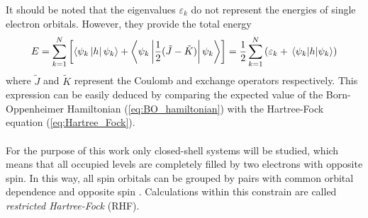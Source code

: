 It should be noted that the eigenvalues $\varepsilon_k$ %
do not represent the energies of single electron orbitals. However, they provide the total energy
\begin{equation}
    E = \sum_{k=1}^N\left[\ev{\psi_k \left| h\right| \psi_k}+\ev{\psi_k \left|\frac{1}{2}(\tilde{J}-\tilde{K}) \right| \psi_k}\right]=\nonumber\frac{1}{2}\sum_{k=1}^{N}\left(\varepsilon_k+\mel{\psi_k}{h}{\psi_k}\right)
    \label{eq:energies_heps}
\end{equation}
where $\tilde{J}$ and $\tilde{K}$ represent the Coulomb and exchange operators respectively. This expression can be easily deduced by comparing the expected value of the Born-Oppenheimer Hamiltonian (\ref{eq:BO_hamiltonian}) with the Hartree-Fock equation (\ref{eq:Hartree_Fock}).\\\\


For the purpose of this work only closed-shell systems will be studied, which means that all occupied levels are completely filled by two electrons with opposite spin. In this way, all spin orbitals can be grouped by pairs with common orbital dependence and opposite spin \cite{computationalphysics}. Calculations within this constrain are called \emph{restricted Hartree-Fock} (RHF).

